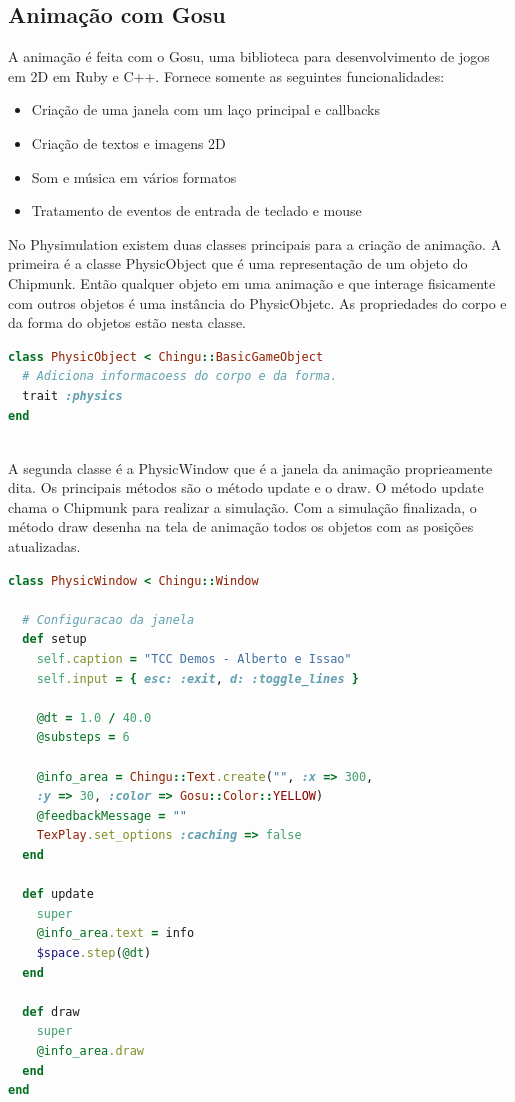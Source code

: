 \subsection{Animação com Gosu}
A animação é feita com o Gosu, uma biblioteca para desenvolvimento de jogos em 2D em Ruby e C++. Fornece somente as seguintes funcionalidades:
\begin{itemize}
  \item Criação de uma janela com um laço principal e callbacks
  \item Criação de textos e imagens 2D
  \item Som e música em vários formatos
  \item Tratamento de eventos de entrada de teclado e mouse
\end{itemize}

No Physimulation existem duas classes principais para a criação de animação. A primeira é a classe PhysicObject que é uma representação de um objeto do
Chipmunk. Então qualquer objeto em uma animação e que interage fisicamente com outros objetos é uma instância do PhysicObjetc. As propriedades do corpo e da 
forma do objetos estão nesta classe.

\begin{lstlisting}[language=Ruby, caption=physics.rb]
class PhysicObject < Chingu::BasicGameObject
  # Adiciona informacoess do corpo e da forma.
  trait :physics
end
\end{lstlisting}

\ \\
A segunda classe é a PhysicWindow que é a janela da animação proprieamente dita.
Os principais métodos são o método update e o draw. O método update chama o Chipmunk para realizar a simulação. Com a simulação finalizada, o método draw
desenha na tela de animação todos os objetos com as posições atualizadas. 

\begin{lstlisting}[language=Ruby, caption=physics.rb]
class PhysicWindow < Chingu::Window

  # Configuracao da janela
  def setup
    self.caption = "TCC Demos - Alberto e Issao"
    self.input = { esc: :exit, d: :toggle_lines }

    @dt = 1.0 / 40.0
    @substeps = 6

    @info_area = Chingu::Text.create("", :x => 300, 
	:y => 30, :color => Gosu::Color::YELLOW)    
    @feedbackMessage = ""
    TexPlay.set_options :caching => false
  end

  def update
    super
    @info_area.text = info
    $space.step(@dt)
  end

  def draw
    super
    @info_area.draw
  end
end
\end{lstlisting}

